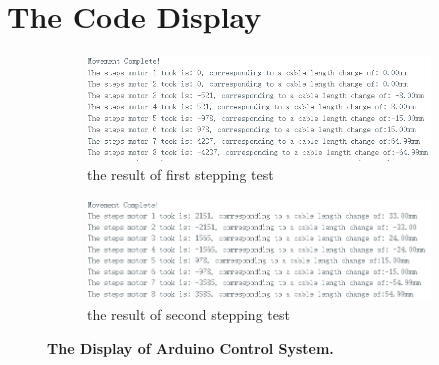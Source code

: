 \chapter{The Code Display}
\label{append:code_display}
\begin{figure}[H] %
    \centering %
    \captionsetup{labelsep=colon}
    \begin{subfigure}{\textwidth} %
        \centering
        \includegraphics[width=\linewidth]{Image/Code-Display/arduino2.png}
        \caption{\centering the result of first stepping test}
        \label{fig:arduino_code_display_2}
    \end{subfigure}
    \begin{subfigure}{\textwidth} %
        \centering
        \includegraphics[width=\linewidth]{Image/Code-Display/arduino3.png}
        \caption{\centering the result of second stepping test}
        \label{fig:arduino_code_display_3}
    \end{subfigure}
    \caption[The Display of Arduino Control System]
    {\centering \textbf{The Display of Arduino Control System.}}
    \label{fig:arduino_code_display}
\end{figure}

